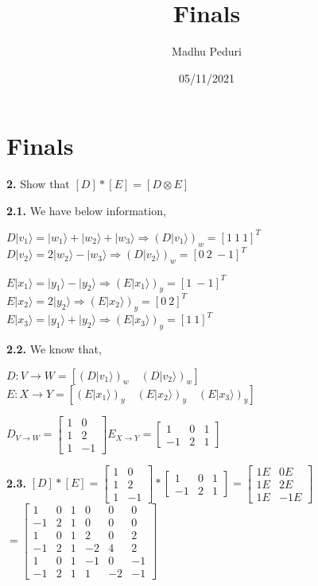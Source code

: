 \documentclass [12pt]{article}
\title{Finals}
\author{Madhu Peduri}
\date{05/11/2021}
\theoremstyle{definition}
\newcommand{\ket}[1]{| {#1} \rangle}
\begin{document}
\section*{Finals}

{\bf 2.} Show that $[D] * [E] = [D \otimes E]$

\phantom{1em} {\bf 2.1.} We have below information,

\phantom{1000em} $D\ket{v_{1}} = \ket{w_{1}} + \ket{w_{2}} + \ket{w_{3}} \Rightarrow (D\ket{v_{1}})_{w} = [1 \ 1 \ 1]^{T}$\\
\phantom{1000em} $D\ket{v_{2}} = 2\ket{w_{2}} - \ket{w_{3}} \Rightarrow (D\ket{v_{2}})_{w} = [0 \ 2 \ -1]^{T}$

\phantom{1000em} $E\ket{x_{1}} = \ket{y_{1}} - \ket{y_{2}} \Rightarrow (E\ket{x_{1}})_{y} = [1 \ -1]^{T}$\\
\phantom{1000em} $E\ket{x_{2}} = 2\ket{y_{2}} \Rightarrow (E\ket{x_{2}})_{y} = [0 \ 2]^{T}$\\
\phantom{1000em} $E\ket{x_{3}} = \ket{y_{1}} + \ket{y_{2}} \Rightarrow (E\ket{x_{3}})_{y} = [1 \ 1]^{T}$

\phantom{1em} {\bf 2.2.} We know that,

\phantom{1000em} $D : V \rightarrow W = [(D\ket{v_{1}})_{w} \quad (D\ket{v_{2}})_{w}]$\\
\phantom{1000em} $E : X \rightarrow Y = [(E\ket{x_{1}})_{y} \quad (E\ket{x_{2}})_{y} \quad (E\ket{x_{3}})_{y}]$

\phantom{1000em} 
$ D_{V \rightarrow W} = 
\begin{bmatrix} 
	1 & 0 \\ 
	1 & 2 \\
	1 & -1
\end{bmatrix}
E_{X \rightarrow Y} = 
\begin{bmatrix} 
	1 & 0 & 1\\ 
   -1 & 2 & 1
\end{bmatrix}$

\phantom{1em} {\bf 2.3.} $[D] * [E] = 
\begin{bmatrix} 
	1 & 0 \\ 
	1 & 2 \\
	1 & -1
\end{bmatrix}
*
\begin{bmatrix} 
	1 & 0 & 1\\ 
   -1 & 2 & 1
\end{bmatrix}
= 
\begin{bmatrix} 
	1E & 0E \\ 
	1E & 2E \\
	1E & -1E
\end{bmatrix}$\\
\phantom{1000em} $ = 
\begin{bmatrix} 
	1 & 0 & 1 & 0 & 0 & 0\\ 
   -1 & 2 & 1 & 0 & 0 & 0\\
    1 & 0 & 1 & 2 & 0 & 2\\
   -1 & 2 & 1 & -2 & 4 & 2\\
    1 & 0 & 1 & -1 & 0 & -1\\
    -1 & 2 & 1 & 1 & -2 & -1
\end{bmatrix}$
\end{document}
